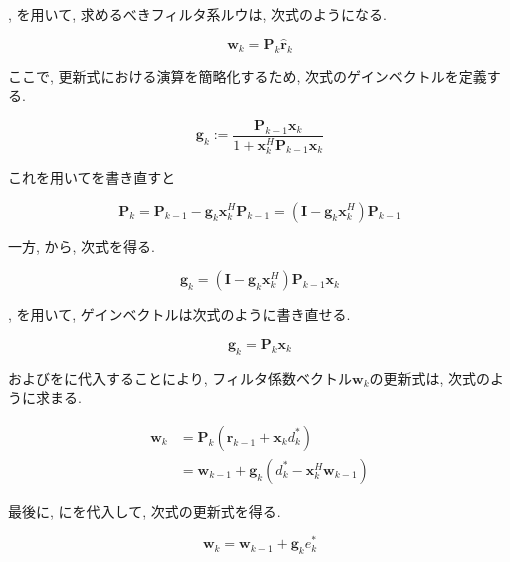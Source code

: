 , 
を用いて, 求めるべきフィルタ系ルウは, 次式のようになる. 

\begin{equation}
\bm{w}_k = \bm{P}_k \hat{\bm{r}}_k
\label{equ:w_simple_rls}
\end{equation}


ここで, 更新式における演算を簡略化するため, 次式のゲインベクトルを定義する. 

\begin{equation}
\bm{g}_k := \frac{\bm{P}_{k-1} \bm{x}_k}{1 + \bm{x}_k^H \bm{P}_{k-1} \bm{x}_k}
\label{equ:g_k_complex}
\end{equation}

これを用いてを書き直すと


\begin{equation}
\bm{P}_k = \bm{P}_{k-1} - \bm{g}_k \bm{x}_k^H \bm{P}_{k-1} = (\bm{I} - \bm{g}_k \bm{x}_k^H) \bm{P}_{k-1}
\label{equ:P_k_flat}
\end{equation}

一方, から, 次式を得る. 

\begin{equation}
\bm{g}_k = (\bm{I} - \bm{g}_k \bm{x}_k^H) \bm{P}_{k-1} \bm{x}_k
\label{equ:g_k_flat}
\end{equation}


, を用いて, ゲインベクトルは次式のように書き直せる. 


\begin{equation}
\bm{g}_k = \bm{P}_k \bm{x}_k
\label{equ:g_k_simple}
\end{equation}


およびをに代入することにより, フィルタ係数ベクトル\(\bm{w}_k\)の更新式は, 次式のように求まる. 

\begin{equation}
\begin{split}
\bm{w}_k &= \bm{P}_k (\hat{\bm{r}}_{k-1} + \bm{x}_k d_k^*) \\
         &= \bm{w}_{k-1} + \bm{g}_k (d_k^* - \bm{x}_k^H \bm{w}_{k-1})
\end{split}
\label{equ:w_k_complex}
\end{equation}


最後に, にを代入して, 次式の更新式を得る\cite{signal_processing_for_array}. 

\begin{equation}
\bm{w}_k = \bm{w}_{k-1} + \bm{g}_k e_k^*
\end{equation}


